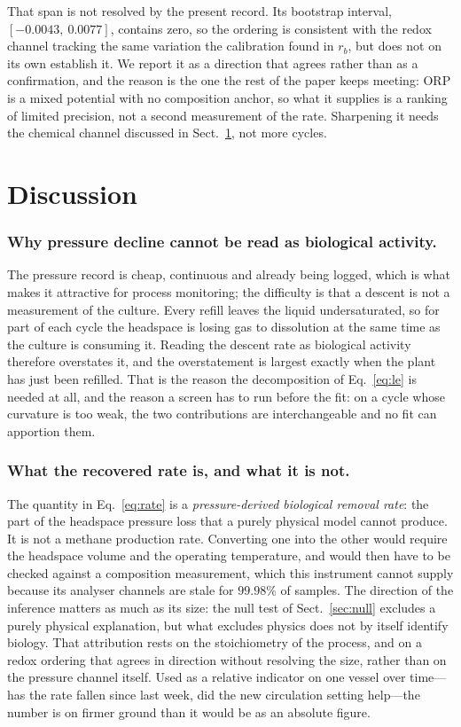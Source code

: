 \documentclass[runningheads]{llncs}
\newcommand{\rb}{\ensuremath{r_{b}}}
\begin{document}
That span is not resolved by the present record. Its bootstrap
interval, $[-0.0043,\ 0.0077]$, contains zero, so the ordering is
consistent with the redox channel tracking the same variation the
calibration found in \rb{}, but does not on its own establish it. We
report it as a direction that agrees rather than as a confirmation, and
the reason is the one the rest of the paper keeps meeting: ORP is a
mixed potential with no composition anchor, so what it supplies is a
ranking of limited precision, not a second measurement of the rate.
Sharpening it needs the chemical channel discussed in
Sect.~\ref{sec:limits}, not more cycles.

\section{Discussion}
\label{sec:limits}

\subsubsection{Why pressure decline cannot be read as biological
activity.}
The pressure record is cheap, continuous and already being logged,
which is what makes it attractive for process monitoring; the
difficulty is that a descent is not a measurement of the culture. Every
refill leaves the liquid undersaturated, so for part of each cycle the
headspace is losing gas to dissolution at the same time as the culture
is consuming it. Reading the descent rate as biological activity
therefore overstates it, and the overstatement is largest exactly when
the plant has just been refilled. That is the reason the decomposition
of Eq.~\eqref{eq:le} is needed at all, and the reason a screen has to
run before the fit: on a cycle whose curvature is too weak, the two
contributions are interchangeable and no fit can apportion them.

\subsubsection{What the recovered rate is, and what it is not.}
The quantity in Eq.~\eqref{eq:rate} is a \emph{pressure-derived
biological removal rate}: the part of the headspace pressure loss that
a purely physical model cannot produce. It is not a methane production
rate. Converting one into the other would require the headspace volume
and the operating temperature, and would then have to be checked
against a composition measurement, which this instrument cannot supply
because its analyser channels are stale for $99.98\%$ of samples. The
direction of the inference matters as much as its size: the null test
of Sect.~\ref{sec:null} excludes a purely physical explanation, but
what excludes physics does not by itself identify biology. That
attribution rests on the stoichiometry of the process, and on a redox
ordering that agrees in direction without resolving the size, rather
than on the pressure channel itself.
Used as a relative indicator on one vessel over time---has the rate
fallen since last week, did the new circulation setting help---the
number is on firmer ground than it would be as an absolute figure.
\end{document}
